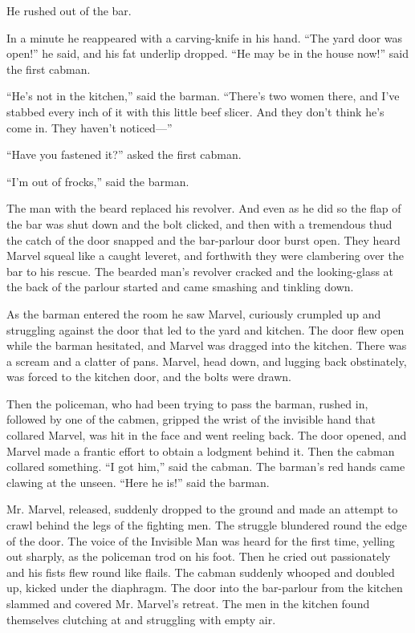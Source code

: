 He rushed out of the bar.

In a minute he reappeared with a carving-knife in his hand. “The yard door was open!” he said, and his fat underlip dropped. “He may be in the house now!” said the first cabman.

“He’s not in the kitchen,” said the barman. “There’s two women there, and I’ve stabbed every inch of it with this little beef slicer. And they don’t think he’s come in. They haven’t noticed—”

“Have you fastened it?” asked the first cabman.

“I’m out of frocks,” said the barman.

The man with the beard replaced his revolver. And even as he did so the flap of the bar was shut down and the bolt clicked, and then with a tremendous thud the catch of the door snapped and the bar-parlour door burst open. They heard Marvel squeal like a caught leveret, and forthwith they were clambering over the bar to his rescue. The bearded man’s revolver cracked and the looking-glass at the back of the parlour started and came smashing and tinkling down.

As the barman entered the room he saw Marvel, curiously crumpled up and struggling against the door that led to the yard and kitchen. The door flew open while the barman hesitated, and Marvel was dragged into the kitchen. There was a scream and a clatter of pans. Marvel, head down, and lugging back obstinately, was forced to the kitchen door, and the bolts were drawn.

Then the policeman, who had been trying to pass the barman, rushed in, followed by one of the cabmen, gripped the wrist of the invisible hand that collared Marvel, was hit in the face and went reeling back. The door opened, and Marvel made a frantic effort to obtain a lodgment behind it. Then the cabman collared something. “I got him,” said the cabman. The barman’s red hands came clawing at the unseen. “Here he is!” said the barman.

Mr. Marvel, released, suddenly dropped to the ground and made an attempt to crawl behind the legs of the fighting men. The struggle blundered round the edge of the door. The voice of the Invisible Man was heard for the first time, yelling out sharply, as the policeman trod on his foot. Then he cried out passionately and his fists flew round like flails. The cabman suddenly whooped and doubled up, kicked under the diaphragm. The door into the bar-parlour from the kitchen slammed and covered Mr. Marvel’s retreat. The men in the kitchen found themselves clutching at and struggling with empty air.

